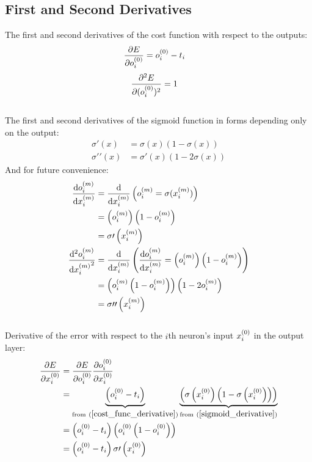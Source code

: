 \subsection{First and Second Derivatives} 
The first and second derivatives of the cost function with respect to the outputs:
\begin{align}
\pdv{E}{o_{i}^{(0)}} &= o_{i}^{(0)} - t_{i} \label{cost_func_derivative}
\end{align}
\begin{align}
\pdv[2]{E}{(o_{i}^{(0)})} &= 1\label{cost_func_2nd_derivative}
\end{align}
\\[5pt]
The first and second derivatives of the sigmoid function in forms depending only on the output:
\begin{align}
\sigma\prime(x) &= \sigma(x)\left(1 - \sigma(x)\right)\label{sigmoid_derivative} 
\\
\sigma\prime\prime(x) &= \sigma\prime(x)\left(1 - 2\sigma(x)\right) \label{sigmoid_2nd_derivative}
\end{align}
And for future convenience: 
\begin{align}
\dv{o_{i}^{(m)}}{x_{i}^{(m)}} &= 
\dv{}{x_{i}^{(m)}}\left({o_{i}^{(m)}} = \sigma(x_{i}^{(m)})\right) 
\\
&= \left(o_{i}^{(m)}\right)\left(1 - o_{i}^{(m)}\right)
\\
&= \sigma\prime\left(x_{i}^{(m)}\right)
\\
\dv[2]{{o_{i}^{(m)}}}{{x_{i}^{(m)}}} &=
\dv{}{{x_{i}^{(m)}}}\left(\dv{o_{i}^{(m)}}{x_{i}^{(m)}} = \left(o_{i}^{(m)}\right)\left(1 - o_{i}^{(m)}\right)\right)
\\
&= \left(o_{i}^{(m)}\left(1 - o_{i}^{(m)}\right)\right)\left(1 - 2o_{i}^{(m)}\right)
\\
&= \sigma\prime\prime\left(x_{i}^{(m)}\right)
\end{align}
\\[5pt]Derivative of the error with respect to the $i$th neuron's input $x_{i}^{(0)}$ in the output layer:
\begin{align}
\pdv{E}{\Input i 0} &= \pdv{E}{\Out i 0} \pdv{\Out i 0}{\Input i 0} 
\\
&= \underbrace{\left(\Out i 0 - \Target i\right)}_{\text{from} \ (\ref{cost_func_derivative})} \underbrace{\left(\sigma\left(\Input i 0\right)\left(1 - \sigma\left(\Input i 0\right)\right)\right)}_{\text{from} \ (\ref{sigmoid_derivative})}
\\
&= \left(\Out i 0 - \Target i\right)\left(\Out i 0 \left(1 - \Out i 0\right)\right)
\\
&= \left(\Out i 0 - \Target i\right)\sigma\prime\left(\Input i 0\right)
\end{align}
